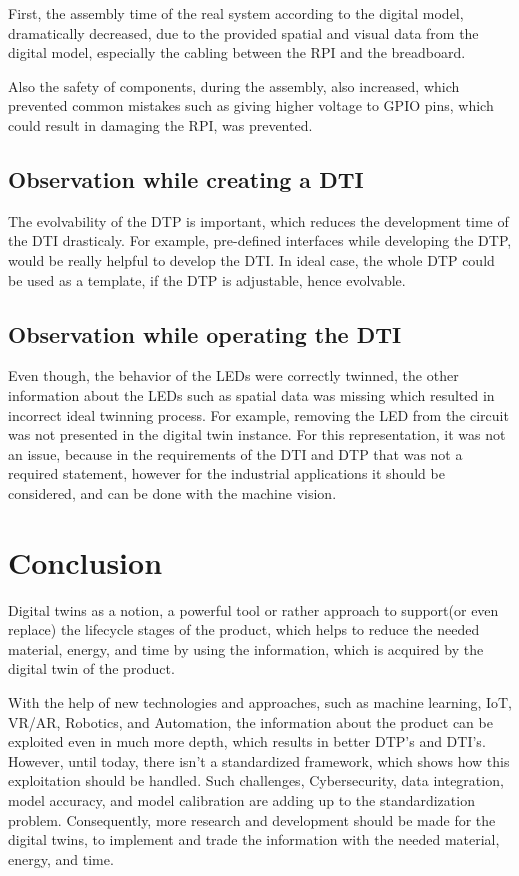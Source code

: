 \documentclass[conference]{IEEEtran}
\begin{document}
    First, the assembly time of the real system according to the digital model, dramatically decreased, due to the provided spatial and visual data from the digital model, especially the cabling between the RPI and the breadboard. 

    Also the safety of components, during the assembly, also increased, which prevented common mistakes such as giving higher voltage to GPIO pins, which could result in damaging the RPI, was prevented. 

    \subsection{Observation while creating a DTI}

    The evolvability of the DTP is important, which reduces the development time of the DTI drasticaly. For example, pre-defined interfaces while developing the DTP, would be really helpful to develop the DTI. In ideal case, the whole DTP could be used as a template, if the DTP is adjustable, hence evolvable. 

    \subsection{Observation while operating the DTI}

    Even though, the behavior of the LEDs were correctly twinned, the other information about the LEDs such as spatial data was missing which resulted in incorrect ideal twinning process. For example, removing the LED from the circuit was not presented in the digital twin instance. For this representation, it was not an issue, because in the requirements of the DTI and DTP that was not a required statement, however for the industrial applications it should be considered, and can be done with the machine vision. 

    \section{Conclusion}

    Digital twins as a notion, a powerful tool or rather approach to support(or even replace) the lifecycle stages of the product, which helps to reduce the needed material, energy, and time by using the information, which is acquired by the digital twin of the product. 

    With the help of new technologies and approaches, such as machine learning, IoT, VR/AR, Robotics, and Automation,  the information about the product can be exploited even in much more depth, which results in better DTP's and DTI's. However, until today, there isn't a standardized framework, which shows how this exploitation should be handled. Such challenges, Cybersecurity, data integration, model accuracy, and model calibration are adding up to the standardization problem. Consequently, more research and development should be made for the digital twins, to implement and trade the information with the needed material, energy, and time. 
\end{document}
